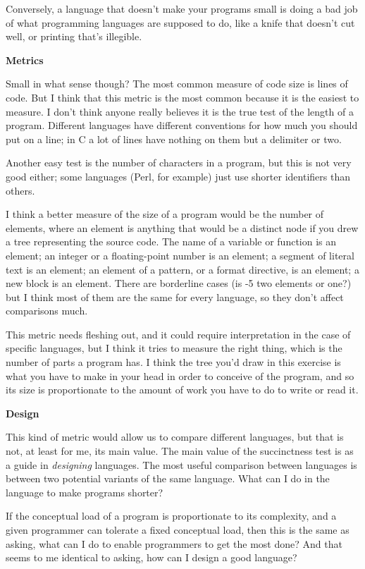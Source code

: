 Conversely, a language that doesn't make your programs small is doing a
bad job of what programming languages are supposed to do, like a knife
that doesn't cut well, or printing that's illegible.

\textbf{Metrics}

Small in what sense though? The most common measure of code size is
lines of code. But I think that this metric is the most common because
it is the easiest to measure. I don't think anyone really believes it is
the true test of the length of a program. Different languages have
different conventions for how much you should put on a line; in C a lot
of lines have nothing on them but a delimiter or two.

Another easy test is the number of characters in a program, but this is
not very good either; some languages (Perl, for example) just use
shorter identifiers than others.

I think a better measure of the size of a program would be the number of
elements, where an element is anything that would be a distinct node if
you drew a tree representing the source code. The name of a variable or
function is an element; an integer or a floating-point number is an
element; a segment of literal text is an element; an element of a
pattern, or a format directive, is an element; a new block is an
element. There are borderline cases (is -5 two elements or one?) but I
think most of them are the same for every language, so they don't affect
comparisons much.

This metric needs fleshing out, and it could require interpretation in
the case of specific languages, but I think it tries to measure the
right thing, which is the number of parts a program has. I think the
tree you'd draw in this exercise is what you have to make in your head
in order to conceive of the program, and so its size is proportionate to
the amount of work you have to do to write or read it.

\textbf{Design}

This kind of metric would allow us to compare different languages, but
that is not, at least for me, its main value. The main value of the
succinctness test is as a guide in \emph{designing} languages. The most
useful comparison between languages is between two potential variants of
the same language. What can I do in the language to make programs
shorter?

If the conceptual load of a program is proportionate to its complexity,
and a given programmer can tolerate a fixed conceptual load, then this
is the same as asking, what can I do to enable programmers to get the
most done? And that seems to me identical to asking, how can I design a
good language?

